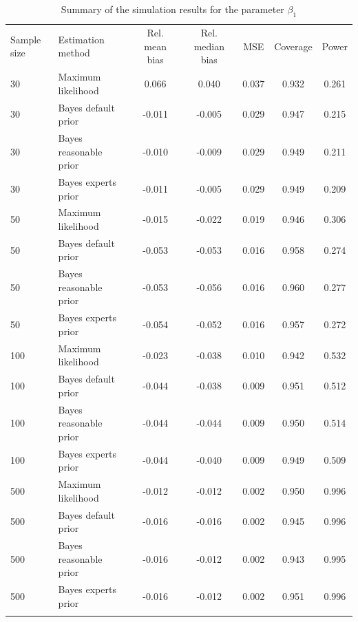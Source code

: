 \documentclass[graybox]{svmult}
\begin{document}
\begin{table}
\caption{Summary of the simulation results for the parameter $\beta_1$}
\label{tab:}
\begin{tabular}[t]{llccccc}
\hline\noalign{\smallskip}
Sample size & Estimation method & Rel. mean bias & Rel. median bias & MSE & Coverage & Power\\
\noalign{\smallskip}\svhline\noalign{\smallskip}
30 & Maximum likelihood & 0.066 & 0.040 & 0.037 & 0.932 & 0.261\\
30 & Bayes default prior & -0.011 & -0.005 & 0.029 & 0.947 & 0.215\\
30 & Bayes reasonable prior & -0.010 & -0.009 & 0.029 & 0.949 & 0.211\\
30 & Bayes experts prior & -0.011 & -0.005 & 0.029 & 0.949 & 0.209\\
\noalign{\smallskip}
50 & Maximum likelihood & -0.015 & -0.022 & 0.019 & 0.946 & 0.306\\
50 & Bayes default prior & -0.053 & -0.053 & 0.016 & 0.958 & 0.274\\
50 & Bayes reasonable prior & -0.053 & -0.056 & 0.016 & 0.960 & 0.277\\
50 & Bayes experts prior & -0.054 & -0.052 & 0.016 & 0.957 & 0.272\\
\noalign{\smallskip}
100 & Maximum likelihood & -0.023 & -0.038 & 0.010 & 0.942 & 0.532\\
100 & Bayes default prior & -0.044 & -0.038 & 0.009 & 0.951 & 0.512\\
100 & Bayes reasonable prior & -0.044 & -0.044 & 0.009 & 0.950 & 0.514\\
100 & Bayes experts prior & -0.044 & -0.040 & 0.009 & 0.949 & 0.509\\
\noalign{\smallskip}
500 & Maximum likelihood & -0.012 & -0.012 & 0.002 & 0.950 & 0.996\\
500 & Bayes default prior & -0.016 & -0.016 & 0.002 & 0.945 & 0.996\\
500 & Bayes reasonable prior & -0.016 & -0.012 & 0.002 & 0.943 & 0.995\\
500 & Bayes experts prior & -0.016 & -0.012 & 0.002 & 0.951 & 0.996\\
\noalign{\smallskip}\hline\noalign{\smallskip}
\end{tabular}
\end{table}
\end{document}
